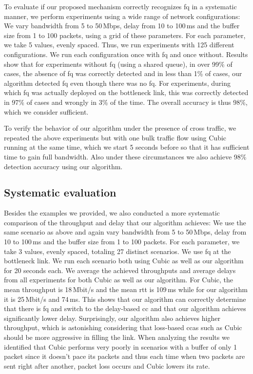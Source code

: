 \documentclass[runningheads]{llncs}
\begin{document}
To evaluate if our proposed mechanism correctly recognizes \gls{fq} in a systematic manner, we perform experiments using a wide range of network configurations: We vary bandwidth from 5 to 50\,Mbps, delay from 10 to 100\,ms and the buffer size from 1 to 100 packets, using a grid of these parameters. For each parameter, we take 5 values, evenly spaced. Thus, we run experiments with 125 different configurations. We run each configuration once with \gls{fq} and once without. Results show that for experiments without \gls{fq} (using a shared queue), in over 99\% of cases, the absence of \gls{fq} was correctly detected and in less than 1\% of cases, our algorithm detected \gls{fq} even though there was no \gls{fq}. For experiments, during which \gls{fq} was actually deployed on the bottleneck link, this was correctly detected in 97\% of cases and wrongly in 3\% of the time. The overall accuracy is thus 98\%, which we consider sufficient. 

To verify the behavior of our algorithm under the presence of cross traffic, we repeated the above experiments but with one bulk traffic flow using Cubic running at the same time, which we start 5 seconds before so that it has sufficient time to gain full bandwidth. Also under these circumstances we also achieve 98\% detection accuracy using our algorithm. 

\subsection{Systematic evaluation}
 
Besides the examples we provided, we also conducted a more systematic comparison of the throughput and delay that our algorithm achieves: We use the same scenario as above and again vary bandwidth from 5 to 50\,Mbps, delay from 10 to 100\,ms and the buffer size from 1 to 100 packets. For each parameter, we take 3 values, evenly spaced, totaling 27 distinct scenarios. We use \gls{fq} at the bottleneck link. We run each scenario both using Cubic as well as our algorithm for 20 seconds each. We average the achieved throughputs and average delays from all experiments for both Cubic as well as our algorithm. For Cubic, the mean throughput is 18\,Mbit/s and the mean \gls{rtt} is 109\,ms while for our algorithm it is 25\,Mbit/s and 74\,ms. This shows that our algorithm can correctly determine that there is \gls{fq} and switch to the delay-based \gls{cc} and that our algorithm achieves significantly lower delay. Surprisingly, our algorithm also achieves higher throughput, which is astonishing considering that loss-based \glspl{cca} such as Cubic should be more aggressive in filling the link. When analyzing the results we identified that Cubic performs very poorly in scenarios with a buffer of only 1 packet since it doesn't pace its packets and thus each time when two packets are sent right after another, packet loss occurs and Cubic lowers its rate. 
\end{document}
